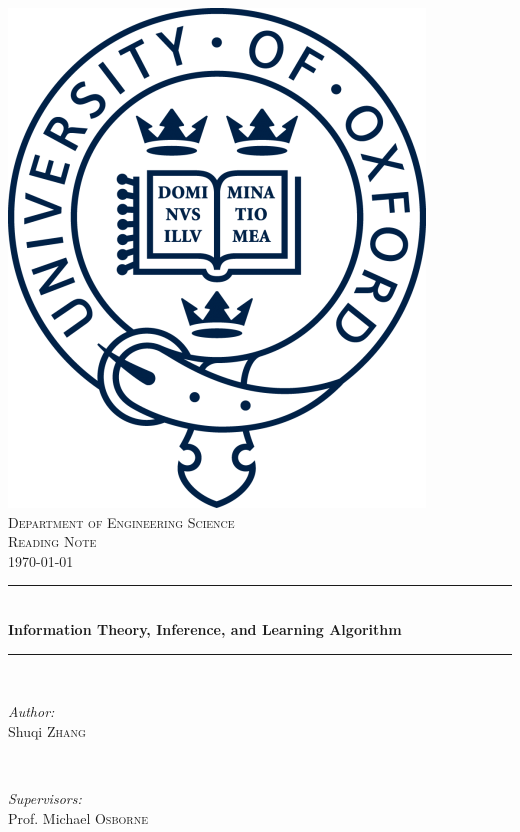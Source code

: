 \documentclass[11pt]{article}
\begin{document}
\doublespacing
{}



\begin{titlepage}

\newcommand{\HRule}{\rule{\linewidth}{0.5mm}} %

\center %
 
\includegraphics[width=0.2\linewidth]{Graph/Oxford-University-Logo.png}\\[1cm]

\textsc{\Large Department of Engineering Science}\\[0.5cm] %
\textsc{\large Reading Note}\\[0.5cm] %
{\large \today}
\HRule \\[0.4cm]
{ \huge \bfseries Information Theory, Inference, and Learning Algorithm}\\[0.4cm] %
\HRule \\[1.5cm]

\begin{minipage}{0.4\textwidth}
\begin{flushleft} \large
\emph{Author:}
\\Shuqi \textsc{Zhang}
\end{flushleft}
\end{minipage}
~
\begin{minipage}{0.4\textwidth}
\begin{flushright} \large
\emph{Supervisors:} \\
Prof. Michael \textsc{Osborne} %
\end{flushright}
\end{minipage}\\[1cm]



\end{titlepage}
\end{document}
